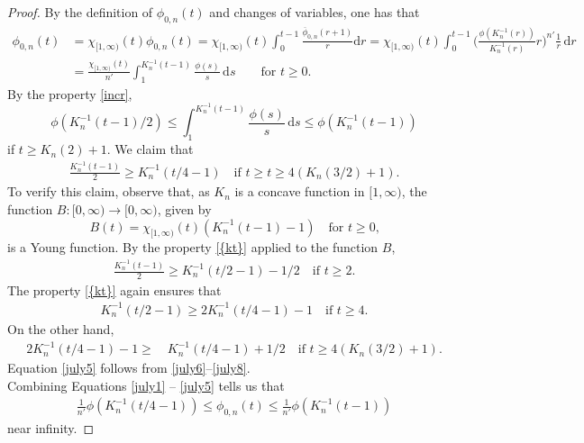 \documentclass[leqno,11pt]{amsart}%
\numberwithin{equation}{section}
\def\d{\mathrm{d}}
\theoremstyle{definition}
\numberwithin{equation}{section}
\begin{document}
\begin{proof} By the definition of $  \phi_{0,n}(t)$ and changes of variables, one has that
\begin{align}
    \label{july1}
     \phi_{0,n}(t)& =  \chi_{[1, \infty)}(t) \phi_{0,n}(t)= \chi_{[1, \infty)}(t)\int_0^{t-1} \frac{\overline \phi_{0,n}(r+1)}{r}\d r  = 
     \chi_{[1, \infty)}(t) \int_0^{t-1}\bigg(\displaystyle\frac{\phi(K_n^{-1}(r))}{K_n^{-1}(r)}r\bigg)^{n'}\frac{1}{r}\,\d r
     \\ \nonumber &=\frac{\chi_{[1, \infty)}(t) }{n'}\int_1^{K_n^{-1}(t-1)}\frac{\phi(s)}{s}\,\d s   \qquad\mbox{for}\,\, t\geq 0.
\end{align}
By the property \eqref{incr}, 
\begin{equation}
    \label{july4}
  \phi (K_n^{-1}(t-1)/2)  \leq \int_1^{K_n^{-1}(t-1)}\frac{\phi(s)}{s}\,\d s \leq \phi ({K_n^{-1}(t-1)})
\end{equation}
if $t \geq K_n(2)+1$. We claim that 
\begin{align}    \label{july5}
    \frac{K_n^{-1}(t-1)}{2}\geq  K_n^{-1}(t/4-1) \quad \text{if $t \geq t \geq 4(K_n(3/2)+1)$.}
\end{align}
To verify this claim, observe that, as $K_n$ is a concave function in $[1, \infty)$, the function $B: [0, \infty) \to [0, \infty)$, given by
$$B(t)= \chi_{[1, \infty)}(t) (K_n^{-1}(t-1)-1) \quad \text{for $t \geq 0$,}$$
is a Young function. By the property \eqref{{kt}} applied to the function $B$, 
\begin{align}
    \label{july6}
\frac{K_n^{-1}(t-1)}{2} \geq K_n^{-1}(t/2-1)-1/2 \quad \text{if $t \geq 2$.}
\end{align}
The   property \eqref{{kt}} again ensures that
\begin{align}
    \label{july7}
 K_n^{-1}(t/2-1) \geq 2 K_n^{-1}(t/4-1)-1 \quad \text{if $t \geq 4$.}
\end{align}
On the other hand,
\begin{align}
    \label{july8}
2 K_n^{-1}(t/4-1)-1 \geq \quad  K_n^{-1}(t/4-1)+ 1/2 \quad \text{if $t \geq 4(K_n(3/2)+1)$.}
\end{align}
Equation \eqref{july5} follows from
\eqref{july6}--\eqref{july8}.
\\Combining Equations \eqref{july1} --  \eqref{july5}  tells us that
\begin{align}
    \label{july10'}
    \frac{1}{n'}\phi(K_n^{-1}(t/4-1)) \leq  \phi_{0,n}(t) \leq \frac{1}{n'}\phi(K_n^{-1}(t-1))
\end{align}
near infinity. 

\end{proof}
\end{document}
